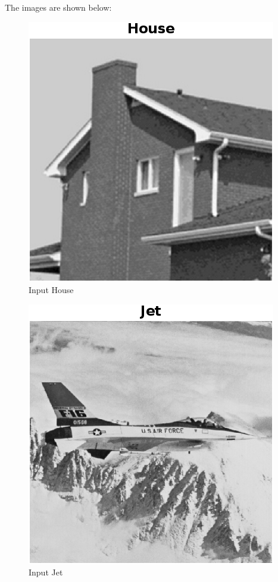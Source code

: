 \documentclass[12pt]{article}
\begin{document}
\begin{enumerate}[leftmargin=\labelsep]
\begin{enumerate}
The images are shown below:
\begin{figure}[H]
    \centering
    \includegraphics[]{Figure/House.png}
    \caption{Input House}
    \label{Q3_1}
\end{figure}

\begin{figure}[H]
    \centering
    \includegraphics[]{Figure/Jet.png}
    \caption{Input Jet}
    \label{Q3_2}
\end{figure}


\end{enumerate}
\end{enumerate}
\end{document}
